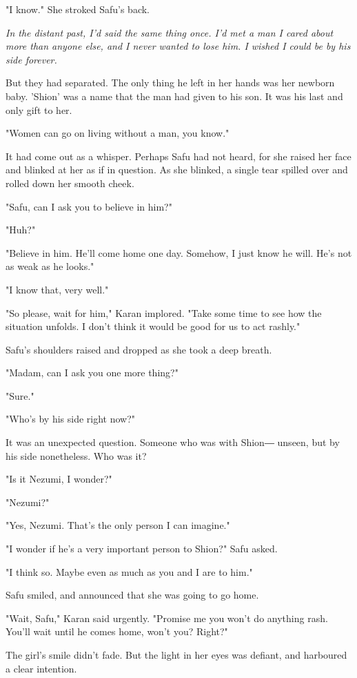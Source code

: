 "I know." She stroked Safu's back.

\emph{In the distant past, I'd said the same thing once. I'd met a man I cared
	about more than anyone else, and I never wanted to lose him. I wished I
	could be by his side forever.}

But they had separated. The only thing he left in her hands was her
newborn baby. 'Shion' was a name that the man had given to his son. It
was his last and only gift to her.

"Women can go on living without a man, you know."

It had come out as a whisper. Perhaps Safu had not heard, for she raised
her face and blinked at her as if in question. As she blinked, a single
tear spilled over and rolled down her smooth cheek.

"Safu, can I ask you to believe in him?"

"Huh?"

"Believe in him. He'll come home one day. Somehow, I just know he will.
He's not as weak as he looks."

"I know that, very well."

"So please, wait for him," Karan implored. "Take some time to see how
the situation unfolds. I don't think it would be good for us to act
rashly."

Safu's shoulders raised and dropped as she took a deep breath.

"Madam, can I ask you one more thing?"

"Sure."

"Who's by his side right now?"

It was an unexpected question. Someone who was with Shion― unseen, but
by his side nonetheless. Who was it?

"Is it Nezumi, I wonder?"

"Nezumi?"

"Yes, Nezumi. That's the only person I can imagine."

"I wonder if he's a very important person to Shion?" Safu asked.

"I think so. Maybe even as much as you and I are to him."

Safu smiled, and announced that she was going to go home.

"Wait, Safu," Karan said urgently. "Promise me you won't do anything
rash. You'll wait until he comes home, won't you? Right?"

The girl's smile didn't fade. But the light in her eyes was defiant, and
harboured a clear intention.

